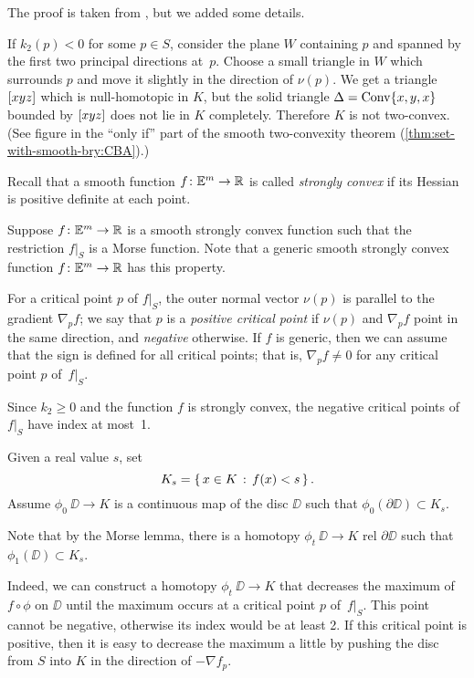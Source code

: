 The proof is taken from \cite[\S\textonehalf]{gromov-1991}, but we added  some details.

If $k_2(p)<0$ for some $p\in S$,
consider the plane $W$ containing $p$ and spanned by the first two principal directions at~$p$.
Choose a small triangle in $W$ which surrounds $p$ and move it slightly in the direction of $\nu(p)$.
We get a triangle $[xyz]$ which is null-homotopic in $K$,
but the solid triangle $\Delta=\mathop{\rm Conv}\nolimits\{x,y,x\}$ bounded by $[xyz]$ does not lie in $K$ completely.
Therefore $K$ is not two-convex.
(See  figure in the ``only if'' part of the smooth two-convexity theorem (\ref{thm:set-with-smooth-bry:CBA}).)

Recall that a smooth function $f\colon\mathbb{E}^m\to\mathbb{R}$ is called \emph{strongly convex} if its Hessian is positive definite at each point.


Suppose $f\colon\mathbb{E}^m\to\mathbb{R}$ is a smooth
 strongly
 convex function such that the restriction $f|_S$ is a Morse function.
Note that a generic smooth 
strongly 
convex function $f\colon\mathbb{E}^m\to\mathbb{R}$ has this property.

For a critical point $p$ of $f|_S$, the outer normal vector $\nu(p)$ is parallel to the gradient $\nabla_pf$;
we say that $p$ is a 
\emph{positive critical point}
if $\nu(p)$ and $\nabla_p f$ point in the same direction, 
and 
\emph{negative} otherwise.
If $f$ is generic, then we can assume that the sign is defined for all critical points;
that is, $\nabla_pf\ne0$ for any critical point $p$ of~$f|_S$.

Since $k_2\ge 0$ and the function $f$ is  strongly
 convex, 
the negative critical points of $f|_S$
have index at most~1.

Given a real value $s$, set 
\[K_s=\left\{\,{x\in K}\,:\,{f(x)<s}\,\right\}.\]
Assume  $\phi_0\:\DD\to K$ is a continuous map of the disc $\DD$
such that $\phi_0(\partial \DD)\subset K_s$.

Note that by the Morse lemma, 
there is a homotopy $\phi_t\:\DD\to K$ rel $\partial \DD$ such that 
$\phi_1(\DD)\subset K_s$.

Indeed, we can construct a homotopy $\phi_t\:\DD\to K$ that decreases the maximum of $f\circ\phi$ on $\DD$ until the maximum occurs at a critical point $p$ of~$f|_S$.
This point cannot be negative, otherwise its index would be at least 2.
If this critical point is positive, then it is easy to decrease the maximum a little by pushing the disc from $S$ into $K$ in the direction of $-\nabla f_p$.

